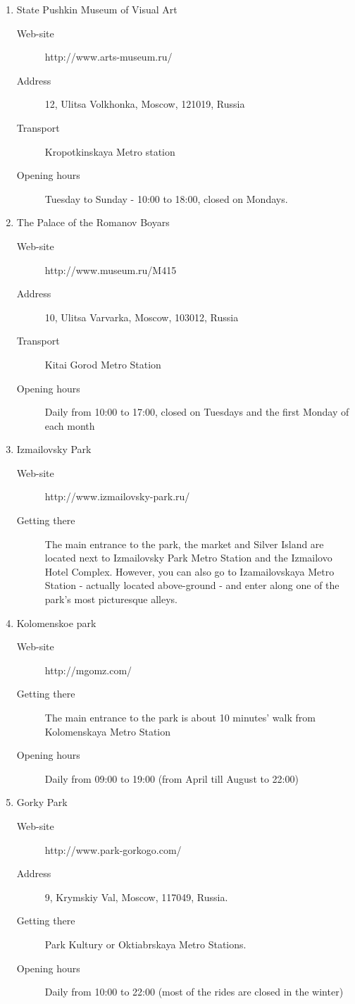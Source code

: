 \documentclass[10pt,fleqn,openany]{book} %
\begin{document}
\begin{enumerate}
	\item State Pushkin Museum of Visual Art
		\begin{description}
			\item[Web-site] http://www.arts-museum.ru/
			\item[Address] 12, Ulitsa Volkhonka, Moscow, 121019, Russia 
			\item[Transport] Kropotkinskaya Metro station
			\item[Opening hours] Tuesday to Sunday - 10:00 to 18:00, closed on Mondays.
		\end{description}

	\item The Palace of the Romanov Boyars
		\begin{description}
			\item[Web-site] http://www.museum.ru/M415 
			\item[Address] 10, Ulitsa Varvarka, Moscow, 103012, Russia 
			\item[Transport] Kitai Gorod Metro Station
			\item[Opening hours] Daily from 10:00 to 17:00, closed on Tuesdays and the first Monday of each month
		\end{description}

	\item Izmailovsky Park
	\begin{description}
		\item[Web-site] http://www.izmailovsky-park.ru/ 
		\item[Getting there] The main entrance to the park, the market and Silver Island are located next to Izmailovsky Park Metro Station and the Izmailovo Hotel Complex. However, you can also go to Izamailovskaya Metro Station - actually located above-ground - and enter along one of the park's most picturesque alleys.
	\end{description}
	
	\item Kolomenskoe park
		\begin{description}
			\item[Web-site] http://mgomz.com/
			\item[Getting there] The main entrance to the park is about 10 minutes' walk from Kolomenskaya Metro Station
			\item[Opening hours] Daily from 09:00 to 19:00 (from April till August to 22:00)
		\end{description}
	
	\item Gorky Park
		\begin{description}
			\item[Web-site] http://www.park-gorkogo.com/ 
			\item[Address] 9, Krymskiy Val, Moscow, 117049, Russia.
			\item[Getting there] Park Kultury or Oktiabrskaya Metro Stations.
			\item[Opening hours] Daily from 10:00 to 22:00 (most of the rides are closed in the winter)
		\end{description}


\end{enumerate}
\end{document}
